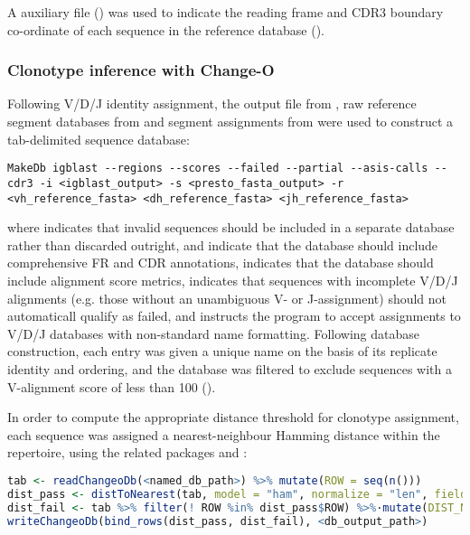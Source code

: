 \noindent A \jh auxiliary file () was used to indicate the reading frame and CDR3 boundary co-ordinate of each \jh sequence in the reference database ().

\subsubsection{Clonotype inference with Change-O}
\label{sec:methods_comp_igpreproc_clones}

Following V/D/J identity assignment, the output  file from , raw reference segment databases from  and segment assignments from  were used to construct a tab-delimited  sequence database:

\begin{lstlisting}
MakeDb igblast --regions --scores --failed --partial --asis-calls --cdr3 -i <igblast_output> -s <presto_fasta_output> -r <vh_reference_fasta> <dh_reference_fasta> <jh_reference_fasta>
\end{lstlisting}

\noindent where  indicates that invalid sequences should be included in a separate database rather than discarded outright,  and  indicate that the database should include comprehensive FR and CDR annotations,  indicates that the database should include alignment score metrics,  indicates that sequences with incomplete V/D/J alignments (e.g. those without an unambiguous V- or J-assignment) should not automaticall qualify as failed, and  instructs the program to accept assignments to V/D/J databases with non-standard name formatting. Following database construction, each entry was given a unique name on the basis of its replicate identity and ordering, and the database was filtered to exclude sequences with a V-alignment score of less than 100 ().

In order to compute the appropriate distance threshold for clonotype assignment, each sequence was assigned a nearest-neighbour Hamming distance within the repertoire, using the related  packages  and  \parencite{gupta2015changeo}:

\begin{lstlisting}[language=R]
tab <- readChangeoDb(<named_db_path>) %>% mutate(ROW = seq(n()))
dist_pass <- distToNearest(tab, model = "ham", normalize = "len", fields = "INDIVIDUAL", first = FALSE)
dist_fail <- tab %>% filter(! ROW %in% dist_pass$ROW) %>%·mutate(DIST_NEAREST = NA) 
writeChangeoDb(bind_rows(dist_pass, dist_fail), <db_output_path>)
\end{lstlisting}

